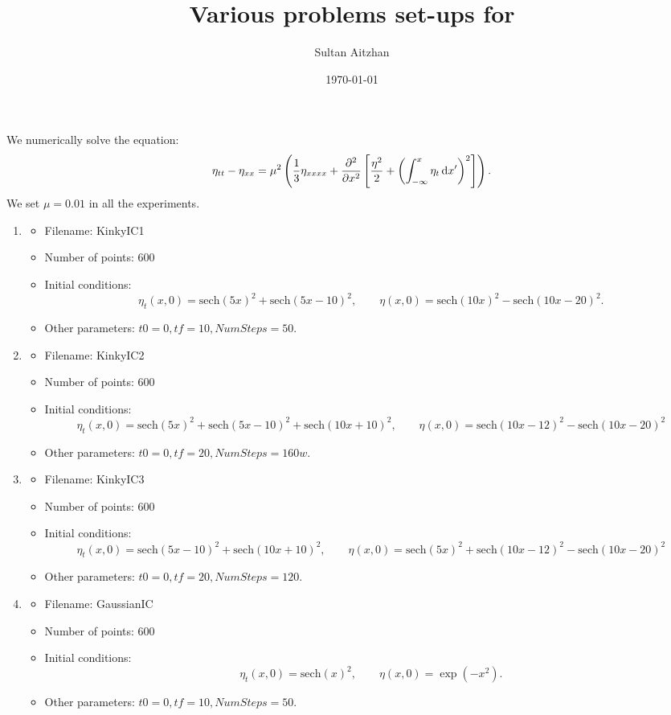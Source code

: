 \documentclass[10pt,reqno,oneside,a4paper]{article}
\author{Sultan Aitzhan}
\title{Various problems set-ups for }
\date{\today}
\begin{document}
\maketitle
\thispagestyle{fancy}
We numerically solve the equation:
\[ 
\eta_{tt} - \eta_{xx} = \mu^2 \left( \frac{1}{3}\eta_{xxxx} +\frac{\partial^2}{\partial x^2}\left[\frac{\eta^2}{2} + \left(\int^x_{-\infty} \eta_t \,\mathrm{d} x' \right)^2\right]\right).
\]
We set $\mu = 0.01$ in all the experiments. 
\begin{enumerate}
\item
\begin{itemize}
\item Filename: KinkyIC1
\item Number of points: 600
\item Initial conditions:
\[ \eta_t(x,0) = \mathrm{sech}(5x)^2 + \mathrm{sech}(5x-10)^2, \qquad \eta(x,0) = \mathrm{sech}(10x)^2 - \mathrm{sech}(10x-20)^2. \]
\item Other parameters: $t0 = 0, tf = 10, NumSteps = 50.$
\end{itemize}
\item
\begin{itemize}
\item Filename: KinkyIC2
\item Number of points: 600
\item Initial conditions:
\[ \eta_t(x,0) = \mathrm{sech}(5x)^2 + \mathrm{sech}(5x-10)^2 + \mathrm{sech}(10x+10)^2, \qquad \eta(x,0) = \mathrm{sech}(10x-12)^2 - \mathrm{sech}(10x-20)^2 \]
\item Other parameters: $t0 = 0, tf = 20, NumSteps = 160w.$
\end{itemize}
\item
\begin{itemize}
\item Filename: KinkyIC3
\item Number of points: 600
\item Initial conditions:
\[ \eta_t(x,0) =  \mathrm{sech}(5x-10)^2 + \mathrm{sech}(10x+10)^2, \qquad \eta(x,0) = \mathrm{sech}(5x)^2 + \mathrm{sech}(10x-12)^2 - \mathrm{sech}(10x-20)^2 \]
\item Other parameters: $t0 = 0, tf = 20, NumSteps = 120.$
\end{itemize}
\item 
\begin{itemize}
\item Filename: GaussianIC
\item Number of points: 600
\item Initial conditions:
\[ \eta_t(x,0) = \mathrm{sech}(x)^2, \qquad \eta(x,0) = \exp(-x^2).
 \]
\item Other parameters: $t0 = 0, tf = 10, NumSteps = 50.$
\end{itemize}

\end{enumerate}




{\small}
\end{document}
